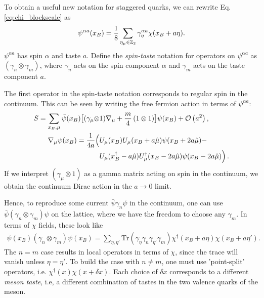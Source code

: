     To obtain a useful new notation for staggered quarks, we can rewrite Eq. \eqref{eq:chi_blockscale} as
    \begin{align}
      \psi^{\alpha a}(x_B) = {1\over 8} \sum_{\eta_{\mu}\in\mathbb{Z}_2} \gamma_{\eta}^{\alpha a} \chi(x_B+a\eta).
    \end{align}
$\psi^{\alpha a}$ has spin $\alpha$ and taste $a$. Define the {\it{spin-taste}} notation for operators on $\psi^{\alpha a}$ as $(\gamma_n\otimes \gamma_m)$, where $\gamma_n$ acts on the spin component $\alpha$ and $\gamma_m$ acts on the taste component $a$. 

    The first operator in the spin-taste notation corresponds to regular spin in the continuum. This can be seen by writing the free fermion action in terms of $\psi^{\alpha a}$:
    \begin{align}
      S = \sum_{x_B,\mu} \bar{\psi}(x_B) \big[ (\gamma_{\mu}\otimes & 1) \nabla_{\mu} + {m\over 4}\, (1\otimes 1)  \big] \psi(x_B) + \mathcal{O}\left( a^2 \right),
        \\
      \nonumber
      \nabla_{\mu}\psi(x_B) = {1\over 4a}\Big( & U_{\mu}(x_B)U_{\mu}(x_B+a\hat{\mu})\psi(x_B+2a\hat{\mu}) - \\ &U_{\mu}(x_B^{\dagger}-a\hat{\mu})U^{\dagger}_{\mu}(x_B-2a\hat{\mu})\psi(x_B-2a\hat{\mu}) \Big)\,.
    \end{align}
If we interpret $(\gamma_{\mu}\otimes 1)$ as a gamma matrix acting on spin in the continuum, we obtain the continuum Dirac action in the $a\to 0$ limit.

    Hence, to reproduce some current $\bar{\psi}\gamma_n\psi$ in the continuum, one can use $\bar{\psi}(\gamma_n\otimes \gamma_m)\psi$ on the lattice, where we have the freedom to choose any $\gamma_m$. In terms of $\chi$ fields, these look like
    \begin{align}
      \bar{\psi}(x_B)(\gamma_n\otimes \gamma_m) \psi(x_B) = \sum_{\eta,\eta'} \text{Tr} (\gamma_{\eta} \gamma_n \gamma_{\eta'} \gamma_m) \chi^{\dagger}(x_B+a\eta) \chi(x_B+a\eta').
    \end{align}
    The $n=m$ case results in local operators in terms of $\chi$, since the trace will vanish unless $\eta=\eta'$. To build the case with $n\neq m$, one must use 'point-split' operators, i.e. $\chi^{\dagger} (x) \chi(x+\delta x)$. Each choice of $\delta x$ corresponds to a different {\it{meson taste}}, i.e, a different combination of tastes in the two valence quarks of the meson.

